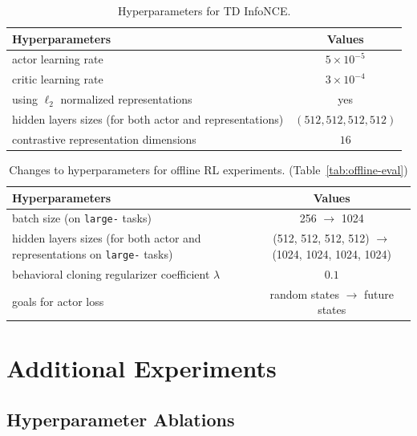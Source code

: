 \documentclass{article} %
\begin{document}
\begin{table}[t]
\caption{\footnotesize Hyperparameters for TD InfoNCE.}
\label{tab:hparams}
\begin{center}
\begin{tabular}{p{8cm}|c}
\toprule
Hyperparameters & Values \\
\midrule
actor learning rate & $5 \times 10^{-5}$ \\ \midrule
critic learning rate & $3 \times 10^{-4}$ \\ \midrule
using $\ell_2$ normalized representations & yes \\ \midrule
hidden layers sizes (for both actor and representations) & $(512, 512, 512, 512)$ \\ \midrule
contrastive representation dimensions & $16$ \\
\bottomrule
\end{tabular}
\end{center}
\end{table}

\begin{table}[t]
\caption{\footnotesize Changes to hyperparameters for offline RL experiments. (Table~\ref{tab:offline-eval})}
\label{tab:hparams-offline}
\begin{center}
\begin{tabular}{p{6cm}|c}
\toprule
Hyperparameters & Values \\
\midrule
batch size (on \texttt{large-} tasks) & 256 $\to$ 1024 \\ \midrule
hidden layers sizes (for both actor and representations on \texttt{large-} tasks) & (512, 512, 512, 512) $\to$ (1024, 1024, 1024, 1024) \\ \midrule
behavioral cloning regularizer coefficient $\lambda$ & $0.1$ \\ \midrule
goals for actor loss & random states $\to$ future states \\
\bottomrule
\end{tabular}
\end{center}
\end{table}

\section{Additional Experiments}

\subsection{Hyperparameter Ablations}
\label{appendix:hyperparam-ablation}
\end{document}
